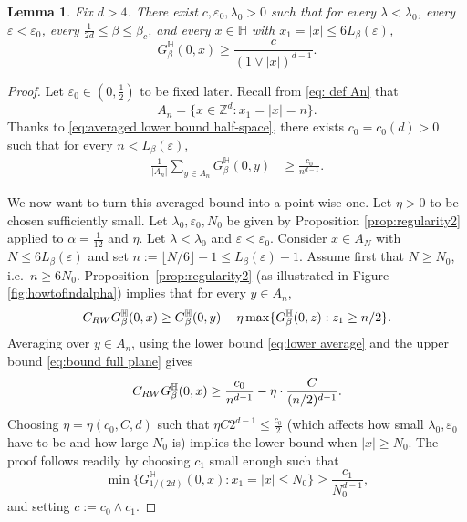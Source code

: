 \documentclass[11pt,a4paper]{article}
\numberwithin{equation}{section}
\theoremstyle{plain}
\newtheorem{Lem}[Thm]{Lemma}
\theoremstyle{definition}
\begin{document}
\begin{Lem}\label{lem:lower below half-space}
Fix $d>4$. There exist $c,\varepsilon_0,\lambda_0>0$ such that for every $\lambda<\lambda_0$, every $\varepsilon<\varepsilon_0$, every $\tfrac1{2d}\le \beta\le \beta_c$, and every $x\in \mathbb H$ with $x_1=|x|\le 6L_\beta(\varepsilon)$,
\begin{equation}\label{eq:op}
G_\beta^{\mathbb H}(0,x)\ge \frac{c}{(1\vee|x|)^{d-1}}.
\end{equation}
\end{Lem}
\begin{proof} Let $\varepsilon_0\in(0,\tfrac12)$ to be fixed later. Recall from \eqref{eq: def An} that
\begin{equation}
A_n=\{x\in \mathbb Z^d:x_1=|x|=n\}.
\end{equation}
Thanks to \eqref{eq:averaged lower bound half-space}, there exists $c_0=c_0(d)>0$ such that for every $n< L_\beta(\varepsilon)$,
\begin{align}\label{eq:lower average}
\frac1{|A_n|}\sum_{y\in A_n}G_{\beta}^{\mathbb H}(0,y)&\geq\frac{c_0}{n^{d-1}}.
\end{align}

We now want to turn this averaged bound into a point-wise one. Let $\eta>0$ to be chosen sufficiently small. Let $\lambda_0,\varepsilon_0,N_0$ be given by Proposition \ref{prop:regularity2} applied to $\alpha=\tfrac{1}{12}$ and $\eta$. Let $\lambda<\lambda_0$ and $\varepsilon<\varepsilon_0$. Consider  $x\in A_N$ with $N\le6L_\beta(\varepsilon)$ and set $n:=\lfloor N/6\rfloor-1\le L_\beta(\varepsilon)-1$. Assume first that $N\geq N_0$, i.e.\ $n\geq 6N_0$.
Proposition~\ref{prop:regularity2} (as illustrated in Figure \ref{fig:howtofindalpha}) implies that for every $y\in A_n$, 
\begin{align}\label{eq:h1}
C_{\rm RW}G_{\beta}^{\mathbb H}(0,x)\ge G_{\beta}^{\mathbb H}(0,y)-\eta \max\{G_{\beta}^{\mathbb H}(0,z):z_1\ge n/2\}.
\end{align}
Averaging over $y\in A_n$, using the lower bound \eqref{eq:lower average} and the upper bound \eqref{eq:bound full plane} gives
\begin{align}\label{eq:h1}
C_{\rm RW}G_{\beta}^{\mathbb H}(0,x)\ge \frac{c_0}{n^{d-1}}-\eta \cdot \frac{C}{(n/2)^{d-1}}.
\end{align}
Choosing $\eta=\eta(c_0,C,d)$ such that $\eta C2^{d-1}\leq \tfrac{c_0}{2}$ (which affects how small $\lambda_0,\varepsilon_0$ have to be and how large $N_0$ is) implies the lower bound when $|x|\geq N_0$. The proof follows readily by choosing $c_1$ small enough such that
\begin{equation}
	\min\{G_{1/(2d)}^{\mathbb H}(0,x):x_1=|x|\leq N_0\}\geq \frac{c_1}{N_0^{d-1}},
\end{equation}
and setting $c:=c_0\wedge c_1$.
\end{proof}
\end{document}
